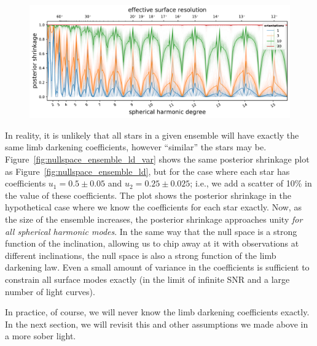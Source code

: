 \documentclass[modern]{aastex62}
\begin{document}
\begin{figure}[t!]
    \begin{centering}
        \includegraphics[width=\linewidth]{figures/nullspace_ensemble_ld_var.pdf}
    \end{centering}
\end{figure}

In reality, it is unlikely that all stars in a given ensemble will have exactly
the same limb darkening coefficients, however ``similar'' the stars may be.
Figure~\ref{fig:nullspace_ensemble_ld_var} shows the same
posterior shrinkage plot as Figure~\ref{fig:nullspace_ensemble_ld},
but for the case where each star has coefficients
$u_1 = 0.5 \pm 0.05$ and $u_2 = 0.25 \pm 0.025$; i.e., we add a scatter of
10\% in the value of these coefficients. The plot shows the posterior
shrinkage in the hypothetical case where we know the coefficients for
each star exactly. Now, as the size of the ensemble increases, the posterior
shrinkage approaches unity \emph{for all spherical harmonic modes}.
In the same way that the null space is a strong function of the inclination,
allowing us to chip away at it with observations at different inclinations,
the null space is also a strong function of the limb darkening law. Even a
small amount of variance in the coefficients is sufficient to constrain all surface
modes exactly (in the limit of infinite SNR and a large number of light curves).

In practice, of course, we will never know the limb darkening coefficients
exactly. In the next section, we will revisit this and other assumptions we
made above in a more sober light.
\end{document}
